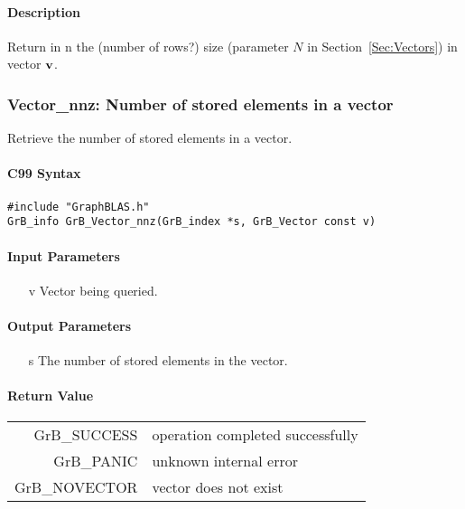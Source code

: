 \paragraph{Description}

Return in {\sf n} the (number of rows?) size (parameter $N$ in Section~\ref{Sec:Vectors}) in vector ${\bf v}$.


\subsubsection{{\sf Vector\_nnz}: Number of stored elements in a vector}

Retrieve the number of stored elements in a vector.

\paragraph{C99 Syntax}

\begin{verbatim}
#include "GraphBLAS.h"
GrB_info GrB_Vector_nnz(GrB_index *s, GrB_Vector const v)
\end{verbatim}

\paragraph{Input Parameters}

\begin{itemize}
	\item[{\sf v}] Vector being queried.
\end{itemize}

\paragraph{Output Parameters}
\begin{itemize}
	\item[{\sf s}] The number of stored elements in the vector. 
\end{itemize}

\paragraph{Return Value}

\begin{tabular}{rl}
{\sf GrB\_SUCCESS}	& operation completed successfully \\
{\sf GrB\_PANIC}	& unknown internal error \\
{\sf GrB\_NOVECTOR}	& vector does not exist \\
\end{tabular}

